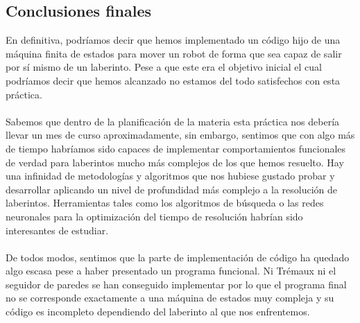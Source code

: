 \documentclass[a4paper,9pt]{article}
\begin{document}
\subsection{Conclusiones finales}
En definitiva, podríamos decir que hemos implementado un código hijo de una máquina finita de estados para mover un 
robot de forma que sea capaz de salir por sí mismo de un laberinto. Pese a que este era el objetivo inicial el cual 
podríamos decir que hemos alcanzado no estamos del todo satisfechos con esta práctica.
\paragraph{}
Sabemos que dentro de la planificación de la materia esta práctica nos debería llevar un mes de curso aproximadamente, 
sin embargo, sentimos que con algo más de tiempo habríamos sido capaces de implementar comportamientos funcionales de verdad 
para laberintos mucho más complejos de los que hemos resuelto. Hay una infinidad de metodologías y algoritmos que nos 
hubiese gustado probar y desarrollar aplicando un nivel de profundidad más complejo a la resolución de laberintos. Herramientas 
tales como los algoritmos de búsqueda o las redes neuronales para la optimización del tiempo de resolución habrían sido interesantes
de estudiar.
\paragraph{}
De todos modos, sentimos que la parte de implementación de código ha quedado algo escasa pese a haber presentado un programa 
funcional. Ni Trémaux ni el seguidor de paredes se han conseguido implementar por lo que el programa final no se corresponde 
exactamente a una máquina de estados muy compleja y su código es incompleto dependiendo del laberinto al que nos enfrentemos.
\end{document}
